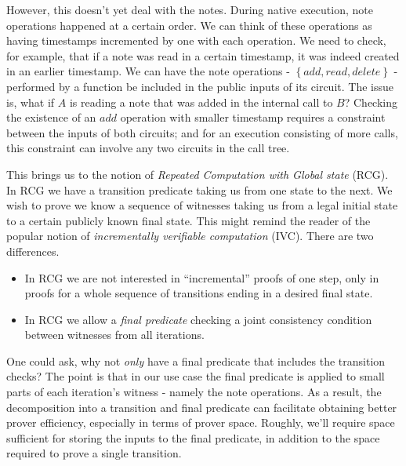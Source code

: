 \documentclass[11pt]{article} %
\newcommand{\set}[1]{\ensuremath{\left\{#1\right\}}\xspace}
\begin{document}
However, this doesn't yet deal with the notes. During native execution, note operations happened at a certain order.
We can think of these operations as having timestamps incremented by one with each operation.
We need to check, for example, that if a note was read in a certain timestamp, it was indeed created
in an earlier timestamp.
We can have the note operations - \set{add, read, delete} - performed by a function be included in the public inputs of its circuit.
The issue is, what if $A$ is reading a note that was added in the internal call to $B$?
Checking the existence of an $add$ operation with smaller timestamp requires a constraint between the inputs of both circuits; and for an execution consisting of more calls, this constraint can involve any two circuits in the call tree.

This brings us to the notion of \emph{Repeated Computation with Global state} (RCG). In RCG we have a transition predicate taking us from one state to the next. We wish to prove we know a sequence of witnesses taking us from a legal initial state to a certain publicly known final state. This might remind the reader of the popular notion of \emph{incrementally verifiable computation} (IVC). There are two differences.

\begin{itemize}
 \item 
In RCG we are not interested in ``incremental'' proofs of one step, only in proofs for a whole
sequence of transitions ending in a desired final state.

\item In RCG we allow a \emph{final predicate} checking a joint consistency condition between witnesses from all iterations.

\end{itemize}
 One could ask, why not \emph{only} have a final predicate that includes the transition checks? 
The point is that in our use case the final predicate is applied to small parts of each iteration's witness - namely the note operations. As a result, the decomposition into a transition and final predicate can facilitate obtaining better prover efficiency, especially in terms of prover space.
Roughly, we'll require space sufficient for storing the inputs to the final predicate, in addition to the space required to prove a single transition.
\end{document}
